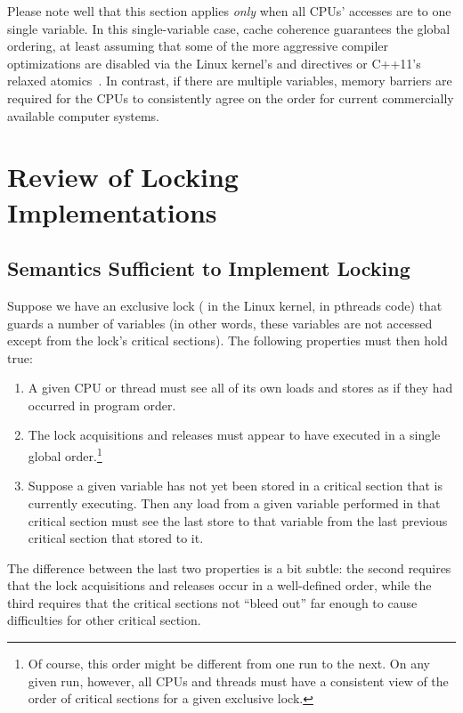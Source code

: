 Please note well that this section applies \emph{only} when all
CPUs' accesses are to one single variable.
In this single-variable case, cache coherence guarantees the
global ordering, at least assuming that some of the more aggressive
compiler optimizations are disabled via the Linux kernel's
 and  directives or C++11's relaxed
atomics~\cite{PeteBecker2011N3242}.
In contrast, if there are multiple variables, memory barriers are
required for the CPUs to consistently agree on the order for current
commercially available computer systems.

\section{Review of Locking Implementations}
\label{sec:memorder:Review of Locking Implementations}

\subsection{Semantics Sufficient to Implement Locking}

Suppose we have an exclusive lock ( in the Linux
kernel,  in pthreads code) that guards a number
of variables (in other words, these variables are not accessed except
from the lock's critical sections).
The following properties must then hold true:
\begin{enumerate}
\item	A given CPU or thread must see all of its own loads and stores
	as if they had occurred in program order.
\item	The lock acquisitions and releases must appear to have executed
	in a single global order.\footnote{
		Of course, this order might be different from one run
		to the next.
		On any given run, however, all CPUs and threads must
		have a consistent view of the order of critical sections
		for a given exclusive lock.}
\item	Suppose a given variable has not yet been stored in a
	critical section that is currently executing.
	Then any load from a given variable performed in that critical section
	must see the last store to that variable from the last previous
	critical section that stored to it.
\end{enumerate}

The difference between the last two properties is a bit subtle:
the second requires that the lock acquisitions and releases occur
in a well-defined order, while the third requires that the critical
sections not ``bleed out'' far enough to cause difficulties for
other critical section.

